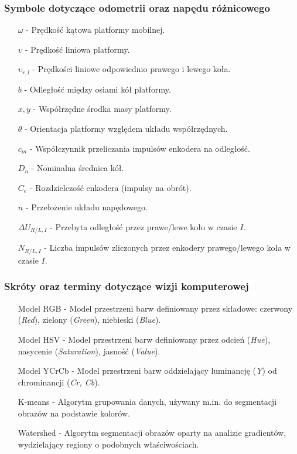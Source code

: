 \subsubsection*{Symbole dotyczące odometrii oraz napędu różnicowego}

\begin{itemize}
    \item[\(\omega\)] - Prędkość kątowa platformy mobilnej.
    \item[\(\upsilon\)] - Prędkość liniowa platformy.
    \item[\(\upsilon_{r, l}\)] - Prędkości liniowe odpowiednio prawego i lewego koła.
    \item[\(b\)] - Odległość między osiami kół platformy.
    \item[\(x , y\)]  - Współrzędne środka masy platformy.
    \item[\(\theta\)]  - Orientacja platformy względem układu współrzędnych.
    \item[\(c_m\)] - Współczynnik przeliczania impulsów enkodera na odległość.
    \item[\(D_n\)] - Nominalna średnica kół.
    \item[\(C_e\)] - Rozdzielczość enkodera (impulsy na obrót).
    \item[\(n\)] - Przełożenie układu napędowego.
    \item[\(\Delta U_{R/L, I}\)] - Przebyta odległość przez prawe/lewe koło w czasie \(I\).
    \item[\(N_{R/L, I}\)] - Liczba impulsów zliczonych przez enkodery prawego/lewego koła w czasie \(I\).
\end{itemize}

\subsubsection*{Skróty oraz terminy dotyczące wizji komputerowej}

\begin{itemize}
    \item[Model RGB] - Model przestrzeni barw definiowany przez składowe: czerwony (\textit{Red}), zielony (\textit{Green}), niebieski (\textit{Blue}).
    \item[Model HSV] - Model przestrzeni barw definiowany przez odcień (\textit{Hue}), nasycenie (\textit{Saturation}), jasność (\textit{Value}).
    \item[Model YCrCb] - Model przestrzeni barw oddzielający luminancję (\textit{Y}) od chrominancji (\textit{Cr, Cb}).
    \item[K-means] - Algorytm grupowania danych, używany m.in. do segmentacji obrazów na podstawie kolorów.
    \item[Watershed] - Algorytm segmentacji obrazów oparty na analizie gradientów, wydzielający regiony o podobnych właściwościach.
\end{itemize}
